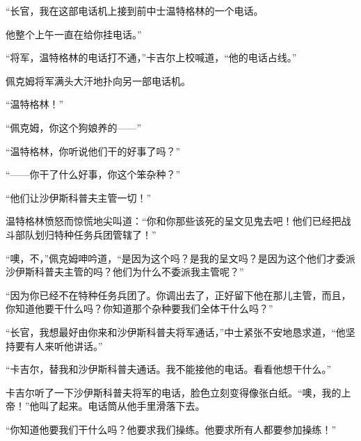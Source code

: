     “长官，我在这部电话机上接到前中士温特格林的一个电话。

    他整个上午一直在给你挂电话。”

    “将军，温特格林的电话打不通，”卡吉尔上校喊道，“他的电话占线。”

    佩克姆将军满头大汗地扑向另一部电话机。

    “温特格林！”

    “佩克姆，你这个狗娘养的——”

    “温特格林，你听说他们干的好事了吗？”

    “——你干了什么好事，你这个笨杂种？”

    “他们让沙伊斯科普夫主管一切！”

    温特格林愤怒而惊慌地尖叫道：“你和你那些该死的呈文见鬼去吧！他们已经把战斗部队划归特种任务兵团管辖了！”

    “噢，不，”佩克姆呻吟道，“是因为这个吗？是我的呈文吗？是因为这个他们才委派沙伊斯科普夫主管的吗？他们为什么不委派我主管呢？”

    “因为你已经不在特种任务兵团了。你调出去了，正好留下他在那儿主管，而且，你知道他要干什么吗？你知道那个杂种要我们全体干什么吗？”

    “长官，我想最好由你来和沙伊斯科普夫将军通话，”中士紧张不安地恳求道，“他坚持要有人来听他讲话。”

    “卡吉尔，替我和沙伊斯科普夫通话。我不能接他的电话。看看他想干什么。”

    卡吉尔听了一下沙伊斯科普夫将军的电话，脸色立刻变得像张白纸。“噢，我的上帝！”他叫了起来。电话筒从他手里滑落下去。

    “你知道他要我们干什么吗？他要求我们操练。他要求所有人都要参加操练！”

